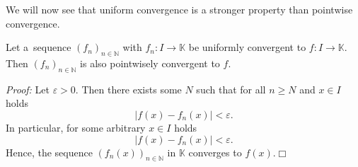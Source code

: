 % 

We will now see that uniform convergence is a stronger property than pointwise convergence.
\begin{Theorem}
Let a~sequence $(f_n)_{n\in\mathbb{N}}$ with $f_n:I\to\mathbb{K}$ be uniformly convergent to $f:I\to\mathbb{K}$. Then
$(f_n)_{n\in\mathbb{N}}$ is also pointwisely convergent to $f$.
\end{Theorem}
{\em Proof:} Let $\varepsilon>0$. Then there exists some $N$ such that for all $n\geq N$ and $x\in I$ holds
\[|f(x)-f_n(x)|<\varepsilon.\]
In particular, for some arbitrary $x\in I$ holds
\[|f(x)-f_n(x)| <\varepsilon.\]
Hence, the sequence $(f_n(x))_{n\in\mathbb{N}}$ in $\mathbb{K}$ converges to $f(x)$.\hfill$\Box$

